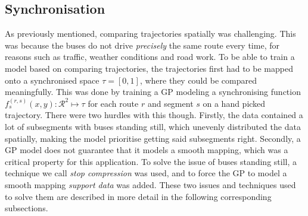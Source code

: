 \subsection{Synchronisation}
As previously mentioned, comparing trajectories spatially was challenging. This was because the buses do not drive \textit{precisely} the same route every time, for reasons such as traffic, weather conditions and road work. To be able to train a model based on comparing trajectories, the trajectories first had to be mapped onto a synchronised space $\tau = [0, 1]$, where they could be compared meaningfully. This was done by training a GP modeling a synchronising function $f^{(r,s)}_s(x, y) : \mathcal{R}^2 \mapsto \tau$ for each route $r$ and segment $s$ on a hand picked trajectory. There were two hurdles with this though. Firstly, the data contained a lot of subsegments with buses standing still, which unevenly distributed the data spatially, making the model prioritise getting said subsegments right. Secondly, a GP model does not guarantee that it models a smooth mapping, which was a critical property for this application. To solve the issue of buses standing still, a technique we call \textit{stop compression} was used, and to force the GP to model a smooth mapping \textit{support data} was added. These two issues and techniques used to solve them are described in more detail in the following corresponding subsections.

